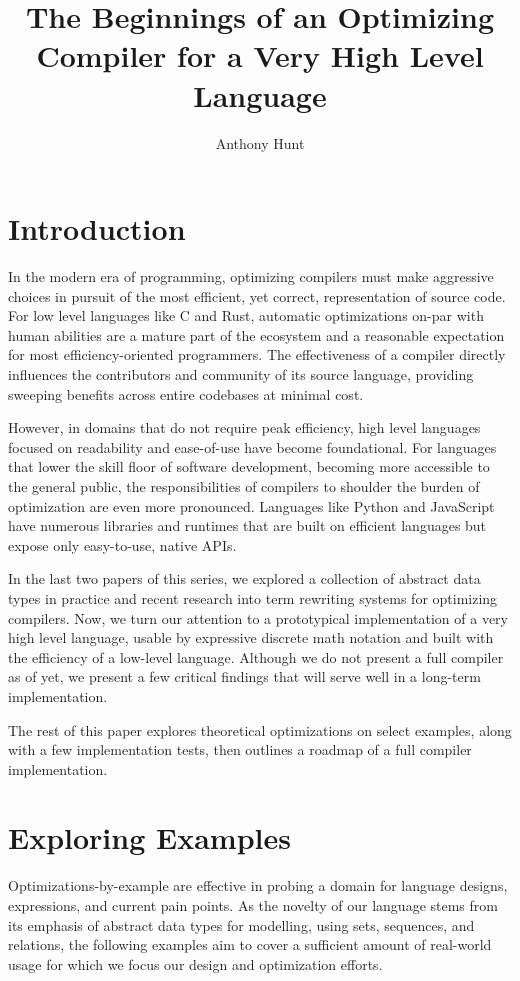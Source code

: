 \documentclass{article}
\title{The Beginnings of an Optimizing Compiler for a Very High Level Language}
\author{Anthony Hunt}
\begin{document}
\maketitle
\tableofcontents
\newpage

\section{Introduction}

In the modern era of programming, optimizing compilers must make aggressive choices in pursuit of the most efficient, yet correct, representation of source code. For low level languages like C and Rust, automatic optimizations on-par with human abilities are a mature part of the ecosystem and a reasonable expectation for most efficiency-oriented programmers. The effectiveness of a compiler directly influences the contributors and community of its source language, providing sweeping benefits across entire codebases at minimal cost.

However, in domains that do not require peak efficiency, high level languages focused on readability and ease-of-use have become foundational. For languages that lower the skill floor of software development, becoming more accessible to the general public, the responsibilities of compilers to shoulder the burden of optimization are even more pronounced. Languages like Python and JavaScript have numerous libraries and runtimes that are built on efficient languages but expose only easy-to-use, native APIs.

In the last two papers of this series, we explored a collection of abstract data types in practice and recent research into term rewriting systems for optimizing compilers. Now, we turn our attention to a prototypical implementation of a very high level language, usable by expressive discrete math notation and built with the efficiency of a low-level language. Although we do not present a full compiler as of yet, we present a few critical findings that will serve well in a long-term implementation.

The rest of this paper explores theoretical optimizations on select examples, along with a few implementation tests, then outlines a roadmap of a full compiler implementation.

\section{Exploring Examples}

Optimizations-by-example are effective in probing a domain for language designs, expressions, and current pain points. As the novelty of our language stems from its emphasis of abstract data types for modelling, using sets, sequences, and relations, the following examples aim to cover a sufficient amount of real-world usage for which we focus our design and optimization efforts.
\end{document}
